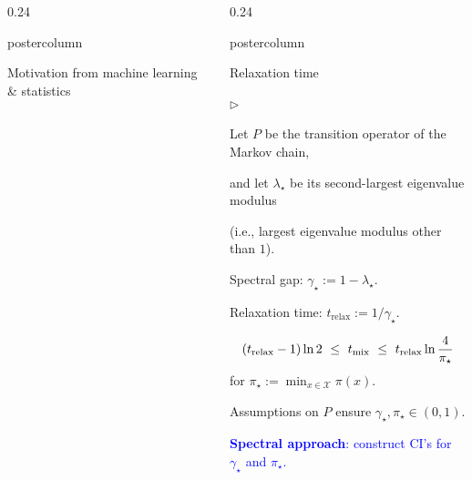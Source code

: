 \documentclass[notheorems,final]{beamer}
\newcommand{\compresslist}{%
  \setlength{\itemsep}{1pt}%
  \setlength{\parskip}{0pt}%
  \setlength{\parsep}{0pt}%
  \setlength{\leftmargin}{0.7cm}%
}
\newlength{\columnheight}
\newcommand{\GREEN}[1]{\textcolor{boldgreen}{#1}}
\newcommand{\BLUE}[1]{\textcolor{blue}{#1}}
\newcommand\tmix{\ensuremath{t_{\operatorname{mix}}}}
\newcommand\trelax{\ensuremath{t_{\operatorname{relax}}}}
\newcommand\pimin{\ensuremath{\pi_{\star}}}
\newcommand\gap{\ensuremath{\gamma_{\star}}}
\newcommand\slem{\ensuremath{\lambda_{\star}}}
\newcommand\states{\ensuremath{\mathcal{X}}}
\begin{document}
\begin{frame}{}
\begin{columns}
\begin{column}{0.24\textwidth}
\begin{beamercolorbox}[center,wd=\textwidth]{postercolumn}
\begin{minipage}[T]{.95\textwidth}
{\begin{block}{Motivation from machine learning \& statistics}
              \end{block}
            }
          \end{minipage}
        \end{beamercolorbox}
      \end{column}
      \begin{column}{0.24\textwidth}
        \begin{beamercolorbox}[center,wd=\textwidth]{postercolumn}
          \begin{minipage}[T]{.95\textwidth}
            \parbox[t][\columnheight]{\textwidth}{
              \begin{block}{Relaxation time}

                \begin{list}{$\triangleright$}\compresslist
                  \item
                    Let $P$ be the \GREEN{transition operator} of the Markov chain,

                    and let $\slem$ be its \GREEN{second-largest eigenvalue modulus}

                    {\small(i.e., largest eigenvalue modulus other than $1$)}.

                    \medskip

                  \item
                    \GREEN{Spectral gap}: $\gap := 1-\slem$.

                    \GREEN{Relaxation time}: $\trelax := 1/\gap$.

                    \vspace{-1.5cm}
                    \[
                      \Parens{ \trelax - 1 } \ln 2
                      \ \leq \
                      \tmix
                      \ \leq \
                      \trelax \ln \frac4{\pimin}
                    \]
                    for $\pimin := \min_{x \in \states} \pi(x)$.

                    \medskip
                    Assumptions on $P$ ensure $\gap, \pimin \in (0,1)$.

                \end{list}

                \begin{center}
                  \BLUE{%
                    \textbf{Spectral approach}: construct CI's for $\gap$ and $\pimin$.
                  }
                \end{center}
              \end{block}

}
\end{minipage}
\end{beamercolorbox}
\end{column}
\end{columns}
\end{frame}
\end{document}
